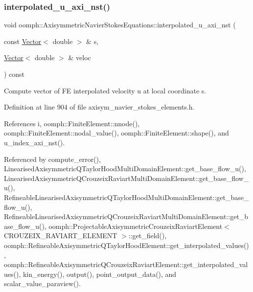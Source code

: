 \mbox{\label{classoomph_1_1AxisymmetricNavierStokesEquations_a6be05bce8f257044e1bb6929aa5e791e}} 
\subsubsection{\texorpdfstring{interpolated\+\_\+u\+\_\+axi\+\_\+nst()}{interpolated\_u\_axi\_nst()}\hspace{0.1cm}{\footnotesize\ttfamily [1/3]}}
{\footnotesize\ttfamily void oomph\+::\+Axisymmetric\+Navier\+Stokes\+Equations\+::interpolated\+\_\+u\+\_\+axi\+\_\+nst (\begin{DoxyParamCaption}\item[{const \hyperlink{classoomph_1_1Vector}{Vector}$<$ double $>$ \&}]{s,  }\item[{\hyperlink{classoomph_1_1Vector}{Vector}$<$ double $>$ \&}]{veloc }\end{DoxyParamCaption}) const\hspace{0.3cm}{\ttfamily [inline]}}



Compute vector of FE interpolated velocity u at local coordinate s. 



Definition at line 904 of file axisym\+\_\+navier\+\_\+stokes\+\_\+elements.\+h.



References i, oomph\+::\+Finite\+Element\+::nnode(), oomph\+::\+Finite\+Element\+::nodal\+\_\+value(), oomph\+::\+Finite\+Element\+::shape(), and u\+\_\+index\+\_\+axi\+\_\+nst().



Referenced by compute\+\_\+error(), Linearised\+Axisymmetric\+Q\+Taylor\+Hood\+Multi\+Domain\+Element\+::get\+\_\+base\+\_\+flow\+\_\+u(), Linearised\+Axisymmetric\+Q\+Crouzeix\+Raviart\+Multi\+Domain\+Element\+::get\+\_\+base\+\_\+flow\+\_\+u(), Refineable\+Linearised\+Axisymmetric\+Q\+Taylor\+Hood\+Multi\+Domain\+Element\+::get\+\_\+base\+\_\+flow\+\_\+u(), Refineable\+Linearised\+Axisymmetric\+Q\+Crouzeix\+Raviart\+Multi\+Domain\+Element\+::get\+\_\+base\+\_\+flow\+\_\+u(), oomph\+::\+Projectable\+Axisymmetric\+Crouzeix\+Raviart\+Element$<$ C\+R\+O\+U\+Z\+E\+I\+X\+\_\+\+R\+A\+V\+I\+A\+R\+T\+\_\+\+E\+L\+E\+M\+E\+N\+T $>$\+::get\+\_\+field(), oomph\+::\+Refineable\+Axisymmetric\+Q\+Taylor\+Hood\+Element\+::get\+\_\+interpolated\+\_\+values(), oomph\+::\+Refineable\+Axisymmetric\+Q\+Crouzeix\+Raviart\+Element\+::get\+\_\+interpolated\+\_\+values(), kin\+\_\+energy(), output(), point\+\_\+output\+\_\+data(), and scalar\+\_\+value\+\_\+paraview().

